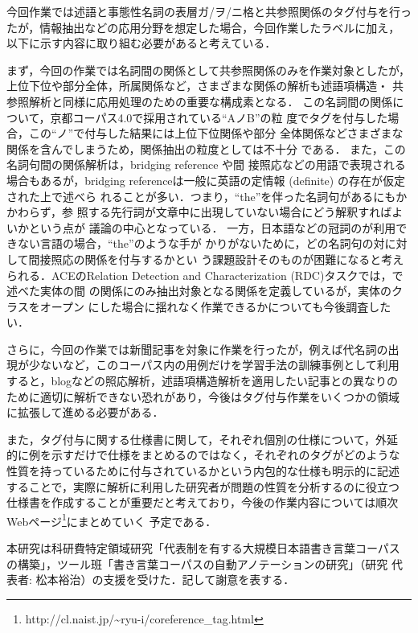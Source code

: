 \documentclass[japanese]{jnlp_1.4}
\def\ssec#1{}
\begin{document}
今回作業では述語と事態性名詞の表層ガ/ヲ/ニ格と共参照関係のタグ付与を行っ
たが，情報抽出などの応用分野を想定した場合，今回作業したラベルに加え，
以下に示す内容に取り組む必要があると考えている．

まず，今回の作業では名詞間の関係として共参照関係のみを作業対象としたが，
上位下位や部分全体，所属関係など，さまざまな関係の解析も述語項構造・
共参照解析と同様に応用処理のための重要な構成素となる．
この名詞間の関係について，京都コーパス4.0で採用されている``AノB''の粒
度でタグを付与した場合，この``ノ''で付与した結果には上位下位関係や部分
全体関係などさまざまな関係を含んでしまうため，関係抽出の粒度としては不十分
である．
また，この名詞句間の関係解析は，bridging reference \cite{Clark:77}や間
接照応\cite{Yamanashi:92}などの用語で表現される場合もあるが，bridging
referenceは一般に英語の定情報 (definite) の存在が仮定された上で述べら
れることが多い．つまり，``the''を伴った名詞句があるにもかかわらず，参
照する先行詞が文章中に出現していない場合にどう解釈すればよいかという点が
議論の中心となっている．
一方，日本語などの冠詞のが利用できない言語の場合，``the''のような手が
かりがないために，どの名詞句の対に対して間接照応の関係を付与するかとい
う課題設計そのものが困難になると考えられる．ACEのRelation Detection
and Characterization (RDC)タスクでは，\ssec{pre_coref}で述べた実体の間
の関係にのみ抽出対象となる関係を定義しているが，実体のクラスをオープン
にした場合に揺れなく作業できるかについても今後調査したい．


さらに，今回の作業では新聞記事を対象に作業を行ったが，例えば代名詞の出
現が少ないなど，このコーパス内の用例だけを学習手法の訓練事例として利用
すると，blogなどの照応解析，述語項構造解析を適用したい記事との異なりの
ために適切に解析できない恐れがあり，今後はタグ付与作業をいくつかの領域
に拡張して進める必要がある．

また，タグ付与に関する仕様書に関して，それぞれ個別の仕様について，外延
的に例を示すだけで仕様をまとめるのではなく，それぞれのタグがどのような
性質を持っているために付与されているかという内包的な仕様も明示的に記述
することで，実際に解析に利用した研究者が問題の性質を分析するのに役立つ
仕様書を作成することが重要だと考えており，今後の作業内容については順次
Webページ\footnote{
    http://cl.naist.jp/\~{}ryu-i/coreference\_tag.html}にまとめていく
予定である．




\acknowledgment

本研究は科研費特定領域研究「代表制を有する大規模日本語書き言葉コーパス
の構築」，ツール班「書き言葉コーパスの自動アノテーションの研究」（研究
代表者: 松本裕治）の支援を受けた．記して謝意を表する．
\end{document}
